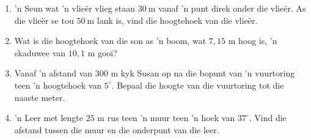 \begin{exercises}{}
{
\begin{enumerate}[noitemsep, label=\textbf{\arabic*}. ] 

\item 'n Seun wat 'n vlie\"er vlieg staan $30~$m vanaf 'n punt direk onder die vlie\"er. As die vlie\"er se tou $50~$m lank is, vind die hoogtehoek van die vlie\"er.
\item Wat is die hoogtehoek van die son as 'n boom, wat $7,15$ m hoog is, 'n skaduwee van $10,1$ m gooi?
\item Vanaf 'n afstand van $300$ m kyk Susan op na die bopunt van 'n vuurtoring teen 'n hoogtehoek van $5^{\circ}$. Bepaal die hoogte van die vuurtoring tot die naaste meter.
\item 'n Leer met lengte $25$ m rus teen 'n muur teen 'n hoek van $37^{\circ}$. Vind die afstand tussen die muur en die onderpunt van die leer. 

\end{enumerate}

}
\end{exercises} 


